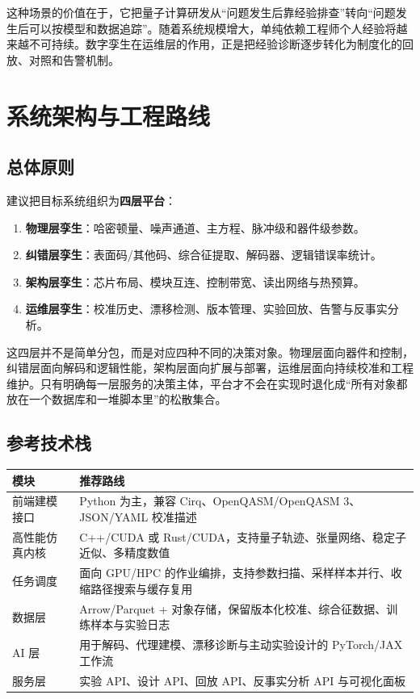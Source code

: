 \documentclass[11pt,a4paper]{article}
\begin{document}
这种场景的价值在于，它把量子计算研发从“问题发生后靠经验排查”转向“问题发生后可以按模型和数据追踪”。随着系统规模增大，单纯依赖工程师个人经验将越来越不可持续。数字孪生在运维层的作用，正是把经验诊断逐步转化为制度化的回放、对照和告警机制。

\section{系统架构与工程路线}

\subsection{总体原则}

建议把目标系统组织为\textbf{四层平台}：

\begin{enumerate}
  \item \textbf{物理层孪生}：哈密顿量、噪声通道、主方程、脉冲级和器件级参数。
  \item \textbf{纠错层孪生}：表面码/其他码、综合征提取、解码器、逻辑错误率统计。
  \item \textbf{架构层孪生}：芯片布局、模块互连、控制带宽、读出网络与热预算。
  \item \textbf{运维层孪生}：校准历史、漂移检测、版本管理、实验回放、告警与反事实分析。
\end{enumerate}

这四层并不是简单分包，而是对应四种不同的决策对象。物理层面向器件和控制，纠错层面向解码和逻辑性能，架构层面向扩展与部署，运维层面向持续校准和工程维护。只有明确每一层服务的决策主体，平台才不会在实现时退化成“所有对象都放在一个数据库和一堆脚本里”的松散集合。

\subsection{参考技术栈}

\begin{longtable}{L{3.4cm}L{10.2cm}}
\toprule
模块 & 推荐路线 \\
\midrule
\endhead
前端建模接口 & Python 为主，兼容 Cirq、OpenQASM/OpenQASM 3、JSON/YAML 校准描述 \\
高性能仿真内核 & C++/CUDA 或 Rust/CUDA，支持量子轨迹、张量网络、稳定子近似、多精度数值 \\
任务调度 & 面向 GPU/HPC 的作业编排，支持参数扫描、采样样本并行、收缩路径搜索与缓存复用 \\
数据层 & Arrow/Parquet + 对象存储，保留版本化校准、综合征数据、训练样本与实验日志 \\
AI 层 & 用于解码、代理建模、漂移诊断与主动实验设计的 PyTorch/JAX 工作流 \\
服务层 & 实验 API、设计 API、回放 API、反事实分析 API 与可视化面板 \\
\bottomrule
\end{longtable}
\end{document}
